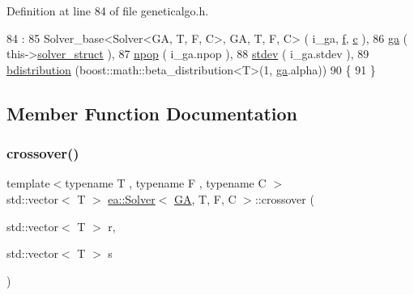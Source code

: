 Definition at line 84 of file geneticalgo.\+h.


\begin{DoxyCode}
84                                             :
85             Solver\_base<Solver<GA, T, F, C>, GA, T, F, C> ( i\_ga, \hyperlink{classea_1_1_solver__base_ae0a893780c93dfe17c1d17301de6494f}{f}, \hyperlink{classea_1_1_solver__base_a6914e89d30e7484f2b4af1783f0de8c3}{c} ), 
86             \hyperlink{classea_1_1_solver_3_01_g_a_00_01_t_00_01_f_00_01_c_01_4_a5e56c4d15894af96c2be5fcaec7d14fb}{ga} ( this->\hyperlink{classea_1_1_solver__base_a5e1d821809f2d26c6f882942ad728127}{solver\_struct} ),
87             \hyperlink{classea_1_1_solver_3_01_g_a_00_01_t_00_01_f_00_01_c_01_4_a805f49211363542de6984c7fd2c97c9c}{npop} ( i\_ga.npop ),
88             \hyperlink{classea_1_1_solver_3_01_g_a_00_01_t_00_01_f_00_01_c_01_4_a097a7ec4bbcf9e5bade6e498d55d4d11}{stdev} ( i\_ga.stdev ),
89             \hyperlink{classea_1_1_solver_3_01_g_a_00_01_t_00_01_f_00_01_c_01_4_a01dbd57c74c1ebd73e4ac976e29ecb33}{bdistribution} (boost::math::beta\_distribution<T>(1, \hyperlink{classea_1_1_solver_3_01_g_a_00_01_t_00_01_f_00_01_c_01_4_a5e56c4d15894af96c2be5fcaec7d14fb}{ga}.alpha))
90         \{
91         \}
\end{DoxyCode}


\subsection{Member Function Documentation}
\mbox{\label{classea_1_1_solver_3_01_g_a_00_01_t_00_01_f_00_01_c_01_4_ad197350b0ef8bc73293fe31978702f02}} 
\subsubsection{\texorpdfstring{crossover()}{crossover()}}
{\footnotesize\ttfamily template$<$typename T , typename F , typename C $>$ \\
std\+::vector$<$ T $>$ \hyperlink{classea_1_1_solver}{ea\+::\+Solver}$<$ \hyperlink{structea_1_1_g_a}{GA}, T, F, C $>$\+::crossover (\begin{DoxyParamCaption}\item[{std\+::vector$<$ T $>$}]{r,  }\item[{std\+::vector$<$ T $>$}]{s }\end{DoxyParamCaption})\hspace{0.3cm}{\ttfamily [private]}}



